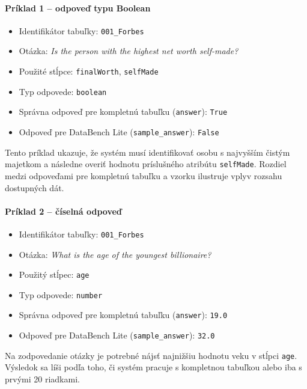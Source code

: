 \paragraph{Príklad 1 -- odpoveď typu Boolean}
\begin{itemize}
    \item Identifikátor tabuľky: \texttt{001\_Forbes}
    \item Otázka: \emph{Is the person with the highest net worth self-made?}
    \item Použité stĺpce: \texttt{finalWorth}, \texttt{selfMade}
    \item Typ odpovede: \texttt{boolean}
    \item Správna odpoveď pre kompletnú tabuľku (\texttt{answer}): \texttt{True}
    \item Odpoveď pre DataBench Lite (\texttt{sample\_answer}): \texttt{False}
\end{itemize}
Tento príklad ukazuje, že systém musí identifikovať osobu s najvyšším čistým majetkom a následne overiť hodnotu príslušného atribútu \texttt{selfMade}. Rozdiel medzi odpoveďami pre kompletnú tabuľku a vzorku ilustruje vplyv rozsahu dostupných dát.

\paragraph{Príklad 2 -- číselná odpoveď}
\begin{itemize}
    \item Identifikátor tabuľky: \texttt{001\_Forbes}
    \item Otázka: \emph{What is the age of the youngest billionaire?}
    \item Použitý stĺpec: \texttt{age}
    \item Typ odpovede: \texttt{number}
    \item Správna odpoveď pre kompletnú tabuľku (\texttt{answer}): \texttt{19.0}
    \item Odpoveď pre DataBench Lite (\texttt{sample\_answer}): \texttt{32.0}
\end{itemize}
Na zodpovedanie otázky je potrebné nájsť najnižšiu hodnotu veku v stĺpci \texttt{age}. Výsledok sa líši podľa toho, či systém pracuje s kompletnou tabuľkou alebo iba s prvými 20 riadkami.

